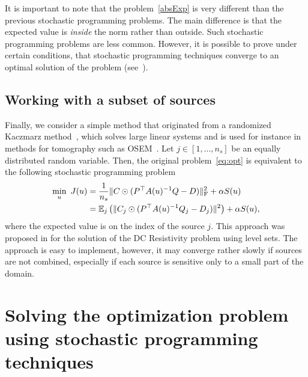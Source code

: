 \documentclass[12pt]{article}
\newcommand{\bbE}{\mathbb{E}}
\begin{document}
It is important to note that the problem~\eqref{absExp} is very different than the previous stochastic programming problems. The main difference is that the expected value is {\em inside} the norm rather than outside. Such stochastic programming problems are less common. However, it is possible to prove under certain conditions, that stochastic programming techniques converge to an optimal solution of the problem (see~\cite[Ch.~4]{shapiroBook}).

\subsection{Working with a subset of sources}
\label{meth4}
Finally, we consider a simple method that originated from a randomized Kaczmarz method~\cite{strohmer2009randomized}, which solves large linear systems and is used for instance in methods for  tomography such as OSEM~\cite{HudsonLarkin1994}. Let $j \in [1,\ldots,n_{s}]$ be an equally distributed random variable. Then, the original problem~\eqref{eq:opt} is equivalent to the following stochastic programming problem
\begin{align} \label{eq:optj}
	\begin{split}
\min_{u} \ J(u) &= {\frac 1{n_{s}}} \|C \odot (P^{\top}A(u)^{-1}Q - D)\|_{\rm F}^{2} + \alpha S(u) \\
&= \bbE_{j}\left( \|C_{j} \odot (P^{\top}A(u)^{-1}Q_{j} - D_{j})\|^{2}\right) + \alpha S(u),
\end{split}
\end{align}
where the expected value is on the index of the source $j$. This approach was proposed in \cite{KeesAscher2011} for the solution of the DC Resistivity problem using level sets. The approach is easy to implement, however, it may converge rather slowly if sources are not combined, especially if each source is sensitive only to a small part of the domain.

\section{Solving the optimization problem using stochastic programming techniques}
\label{sec3}
\end{document}
